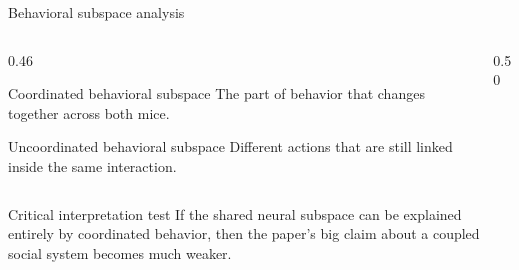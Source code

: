 \documentclass[aspectratio=169,11pt]{beamer}
\begin{document}
\begin{frame}{Behavioral subspace analysis}
\begin{columns}[T]
  \begin{column}{0.46\textwidth}
    \begin{block}{Coordinated behavioral subspace}
    The part of behavior that changes together across both mice.
    \end{block}
    \begin{block}{Uncoordinated behavioral subspace}
    Different actions that are still linked inside the same interaction.
    \end{block}
  \end{column}
  \begin{column}{0.50\textwidth}
    \begin{center}
    \end{center}
  \end{column}
\end{columns}
\vspace{0.4em}
\begin{alertblock}{Critical interpretation test}
If the shared neural subspace can be explained entirely by coordinated behavior, then the paper's big claim about a coupled social system becomes much weaker.
\end{alertblock}
\end{frame}
\end{document}
